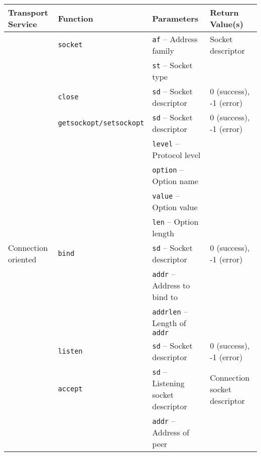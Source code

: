 \documentclass{sig-alternate-05-2015}
\begin{document}
\begin{table*}[t]
  \centering
  \begin{tabularx}{\linewidth}{llll}
    \toprule
      Transport Service            & Function & Parameters                                     & Return Value(s) \\
    \midrule
                                   & \texttt{socket}
                                              & \texttt{af} -- Address family                  & Socket descriptor \\
                                   &          & \texttt{st} -- Socket type & \\
                                   & \texttt{close}
                                              & \texttt{sd} -- Socket descriptor               & 0 (success), -1 (error) \\
    \midrule
                                   & \texttt{getsockopt/setsockopt}                                    
                                              & \texttt{sd} -- Socket descriptor               & 0 (success), -1 (error) \\
                                   &          & \texttt{level} -- Protocol level & \\
                                   &          & \texttt{option} -- Option name & \\
                                   &          & \texttt{value} -- Option value & \\
                                   &          & \texttt{len} -- Option length & \\
    \midrule
      Connection oriented          & \texttt{bind}
                                              & \texttt{sd} -- Socket descriptor               & 0 (success), -1 (error) \\
                                   &          & \texttt{addr} -- Address to bind to & \\
                                   &          & \texttt{addrlen} -- Length of \texttt{addr} & \\
                                   & \texttt{listen}
                                              & \texttt{sd} -- Socket descriptor               & 0 (success), -1 (error) \\
                                   & \texttt{accept}
                                              & \texttt{sd} -- Listening socket descriptor     & Connection socket descriptor \\
                                   &          & \texttt{addr} -- Address of peer & \\

\end{tabularx}
\end{table*}
\end{document}
